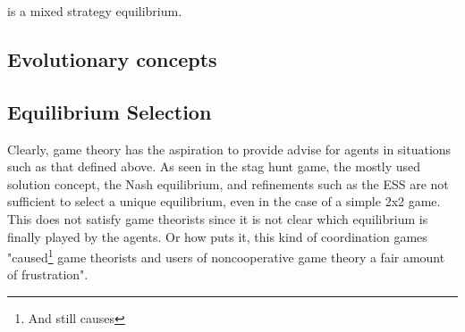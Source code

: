 \documentclass[12pt]{article}
\begin{document}
is a mixed strategy equilibrium. 
\subsection{Evolutionary concepts}

\subsection{Equilibrium Selection}
Clearly, game theory has the aspiration to provide advise for agents in 
situations such as that defined above.
As seen in the stag hunt game, the mostly used solution concept, 
the Nash equilibrium, and refinements such as the ESS are
not sufficient to select a unique equilibrium, even in the case of a simple
2x2 game. This does not satisfy game theorists since it is not clear which
equilibrium is finally played by the agents. Or how \cite{weibull} puts it,
this kind of coordination games "caused\footnote{And still causes} game theorists and users of 
noncooperative game theory a fair amount of frustration". 
\end{document}
